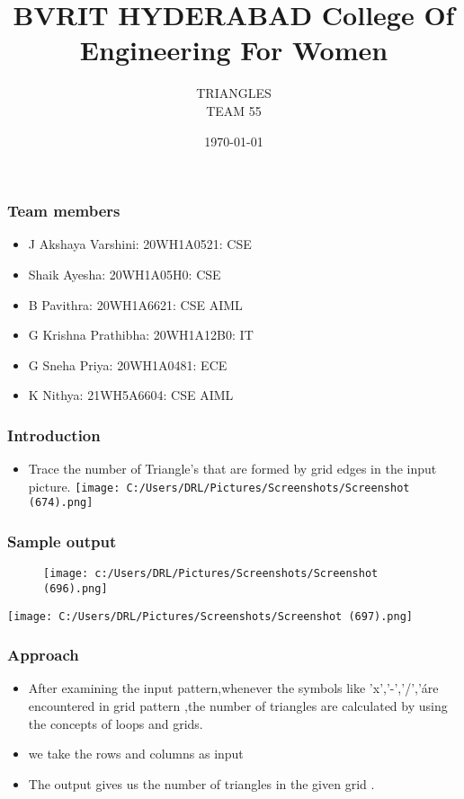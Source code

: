 \documentclass{beamer}
\title{BVRIT HYDERABAD College Of Engineering For Women}
\date{\today}
\author{TRIANGLES\\ TEAM 55 }
\begin{document}
\begin{frame}
    \titlepage
\end{frame}
    \begin{frame}
    \frametitle{Team members}
        \begin{itemize}
      \item J Akshaya Varshini: 20WH1A0521: CSE 
      \item Shaik Ayesha: 20WH1A05H0: CSE 
      \item B Pavithra: 20WH1A6621: CSE AIML
      \item G Krishna Prathibha: 20WH1A12B0: IT 
      \item G Sneha Priya: 20WH1A0481: ECE 
      \item K Nithya: 21WH5A6604: CSE AIML   
        \end{itemize}
   
    \end{frame}
    \begin{frame}
	\frametitle{Introduction}
        \begin{itemize}
	    \item Trace the number of Triangle's that are formed by grid edges in the input picture.	
	    \texttt{[image: C:/Users/DRL/Pictures/Screenshots/Screenshot (674).png]}	
	\end{itemize}
    \end{frame}
    \begin{frame}
        \frametitle{Sample output}
        \begin{figure}[t]
           {\texttt{[image: c:/Users/DRL/Pictures/Screenshots/Screenshot (696).png]}}
           \end{figure}
     \end{frame}
     \begin{frame}
       
        
        \centerline{\texttt{[image: C:/Users/DRL/Pictures/Screenshots/Screenshot (697).png]}}
        
    \end{frame}
    \begin{frame}
	\frametitle{Approach}
	\begin{itemize}
	    \item After examining the input pattern,whenever the symbols like 'x','-','/','\' are encountered in grid pattern ,the number of triangles are calculated by using the concepts of loops and grids.
			   
	    \item we take the rows and columns as input
	    \item The output gives us the number of triangles in  the given grid . 
	\end{itemize}
    \end{frame}
\end{document}
